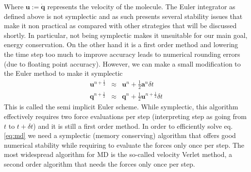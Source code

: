\documentclass[ twoside,openright,titlepage,numbers=noenddot,%
headinclude,footinclude,cleardoublepage=empty,abstract=on,
BCOR=5mm,paper=a4,fontsize=11pt, dvipsnames
]{scrreprt}
\renewcommand{\vec}[1]{\bm{#1}}
\newcommand{\dt}{\delta t}
\newcommand{\half}{\frac{1}{2}}
\newcommand{\ppos}{q}
\newcommand{\pvel}{u}
\begin{document}
Where $\vec{\pvel} := \dot{\vec{\ppos}}$ represents the velocity of the molecule.
The Euler integrator as defined above is not symplectic\cite{symplectic} and as such presents several stability issues that make it non practical as compared with other strategies that will be discussed shortly. In particular, not being symplectic makes it unsuitable for our main goal, energy conservation\cite{eulerdrift}. On the other hand it is a first order method and lowering the time step too much to improve accuracy leads to numerical rounding errors (due to floating point accuracy).
However, we can make a small modification to the Euler method to make it symplectic\cite{HairerNumericalIntegration}
\begin{equation}
  \label{eq:semiimpliciteuler}
  \begin{aligned}
    \vec{\pvel}^{n+\half} &\approx& \vec{\pvel}^n + \half\vec{a}^n\dt\\
    \vec{\ppos}^{n+\half} &\approx& \vec{\ppos}^n + \half\vec{\pvel}^{n+\half}\dt
  \end{aligned}
\end{equation}
This is called the semi implicit Euler scheme\cite{semiimplicitEuler}. While symplectic, this algorithm effectively requires two force evaluations per step (interpreting step as going from $t$ to $t+\dt$) and it is still a first order method.
In order to efficiently solve eq. \eqref{eq:md} we need a symplectic (memory conserving) algorithm that offers good numerical stability while requiring to evaluate the forces only once per step.
The most widespread algorithm for \gls{MD} is the so-called velocity Verlet method\cite{mdvelocityverlet}, a second order algorithm that needs the forces only once per step.
\end{document}
